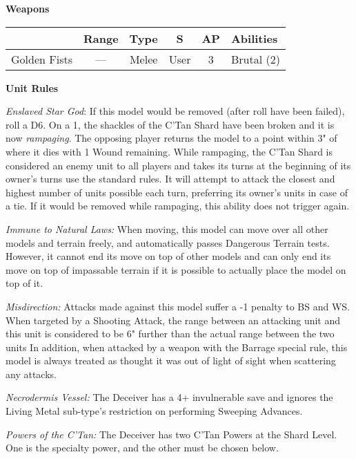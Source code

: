 \begin{minipage}[t]{0.72\textwidth}
	\vspace*{2em}
	\textbf{Weapons}
	
	\begin{tabular}{m{95 pt} *{4}{c} >{\raggedright\arraybackslash}p{130pt}}
		& Range & Type & S & AP & Abilities \\
		\hline
		Golden Fists & — & Melee & User & 3 & Brutal (2) \\
	\end{tabular}
	
	\vspace*{2em}
	\textbf{Unit Rules}
	
	\textit{Enslaved Star God}: If this model would be removed (after  roll have been failed), roll a D6. On a 1, the shackles of the C'Tan Shard have been broken and it is now \textit{rampaging}. The opposing player returns the model to a point within 3" of where it dies with 1 Wound remaining. While rampaging, the C'Tan Shard is considered an enemy unit to all players and takes its turns at the beginning of its owner's turns use the standard rules. It will attempt to attack the closest and highest number of units possible each turn, preferring its owner's units in case of a tie. If it would be removed while rampaging, this ability does not trigger again.
	
	\textit{Immune to Natural Laws:} When moving, this model can move over all other models and terrain freely, and automatically passes Dangerous Terrain tests. However, it cannot end its move on top of other models and can only end its move on top of impassable terrain if it is possible to actually place the model on top of it.
	
	\textit{Misdirection:} Attacks made against this model suffer a -1 penalty to BS and WS. When targeted by a Shooting Attack, the range between an attacking unit and this unit is considered to be 6" further than the actual range between the two units In addition, when attacked by a weapon with the Barrage special rule, this model is always treated as thought it was out of light of sight when scattering any attacks.
	
	\textit{Necrodermis Vessel:} The Deceiver has a 4+ invulnerable save and ignores the Living Metal sub-type's restriction on performing Sweeping Advances.
	
	\textit{Powers of the C'Tan:} The Deceiver has two C'Tan Powers at the Shard Level. One is the  specialty power, and the other must be chosen below.
	

\end{minipage}
